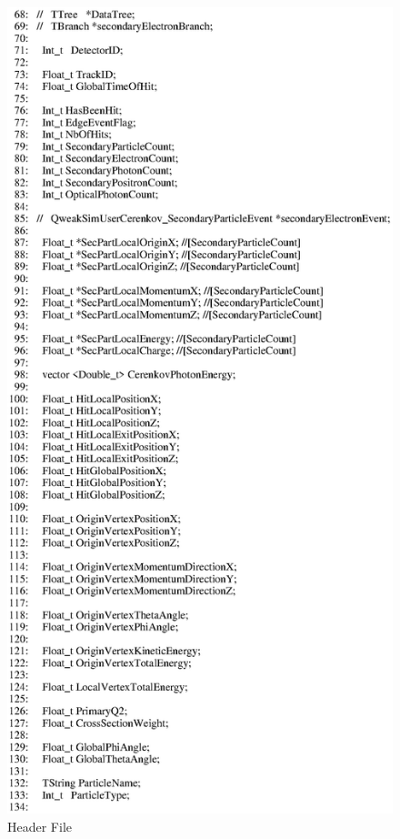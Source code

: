 \begin{figure}[ht]
  \hspace{0cm}
  \includegraphics[scale=0.8]{./figures5/QweakSimUserCerenkov_DetectorEvent.hh-p2.eps}
  \caption{\label{SourceV32} Header File}
           \label{fig:V-SC-35}
\end{figure}

